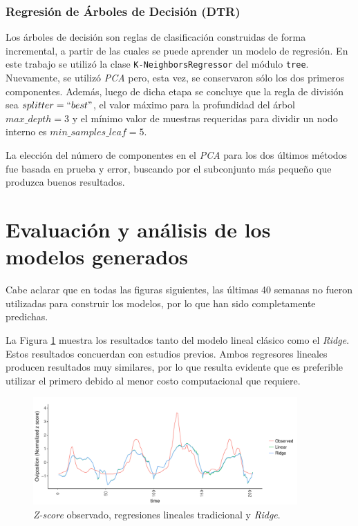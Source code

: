     \subsubsection{Regresión de Árboles de Decisión (DTR)}
      \par Los árboles de decisión son reglas de clasificación construidas de
      forma incremental, a partir de las cuales se puede aprender un modelo
      de regresión. En este trabajo se utilizó la clase \verb|K-NeighborsRegressor|
      del módulo \verb|tree|. Nuevamente, se utilizó \textit{PCA} pero, esta
      vez, se conservaron sólo los dos primeros componentes. Además, luego de
      dicha etapa se concluye que la regla de división sea $splitter = ``best"$,
      el valor máximo para la profundidad del árbol $max\_depth = 3$ y el mínimo
      valor de muestras requeridas para dividir un nodo interno es
      $min\_samples\_leaf = 5$.

      \par La elección del número de componentes en el \textit{PCA} para los
      dos últimos métodos fue basada en prueba y error, buscando por el
      subconjunto más pequeño que produzca buenos resultados.


  \section{Evaluación y análisis de los modelos generados}

    \par Cabe aclarar que en todas las figuras siguientes, las últimas
        40 semanas no fueron utilizadas para construir los modelos, por lo que
        han sido completamente predichas.

    \par La Figura \ref{fig:ridge_vs_time} muestra los resultados tanto del
      modelo lineal clásico como el \textit{Ridge}. Estos resultados concuerdan
      con estudios previos. Ambos regresores lineales producen resultados muy
      similares, por lo que resulta evidente que es preferible utilizar el
      primero debido al menor costo computacional que requiere.

      \begin{figure}[hbt]
      \centering%
      \includegraphics[width=0.9\textwidth]{images/RidgeVsTime}%
      \caption{\textit{Z-score} observado, regresiones lineales tradicional y
               \textit{Ridge}.}\label{fig:ridge_vs_time}
      \end{figure}

